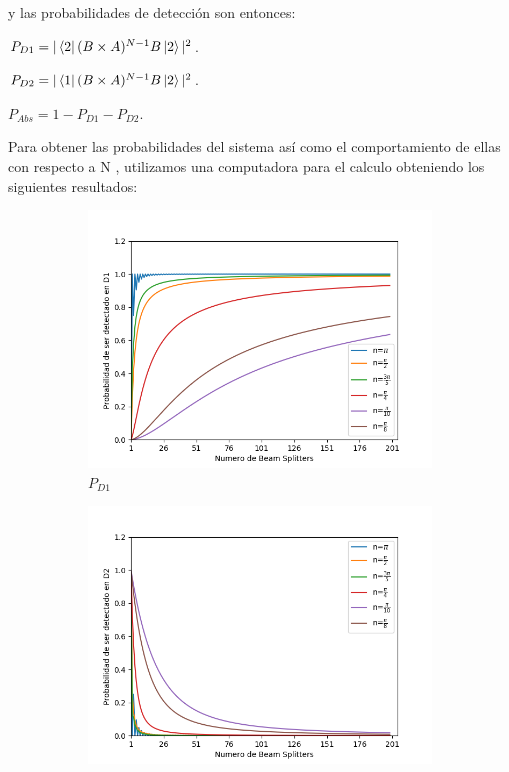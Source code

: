 \documentclass[11pt]{article}
\begin{document}
y las probabilidades de detección son entonces:


 
 
$P_{D1}=|\bra{2} (B \times A)^{N-1}B \ket{2}|^2$.

$P_{D2}=|\bra{1} (B \times A)^{N-1}B \ket{2}|^2$.

$P_{Abs}=1-P_{D1}-P_{D2}$.
 
 
 Para obtener las probabilidades del sistema así como el comportamiento de ellas con respecto a N , utilizamos una computadora para el calculo obteniendo los siguientes resultados:
 
 
\begin{figure}[h!]
\centering
\begin{subfigure}[b]{0.45\linewidth}
\includegraphics[width=\linewidth]{BS_Azuna.png}
\caption{$P_{D1}$}
\label{fig:BS1}
\end{subfigure}
\begin{subfigure}[b]{0.45\linewidth}
\includegraphics[width=\linewidth]{BS_AzunaD2.png}

\end{subfigure}
\end{figure}
\end{document}
